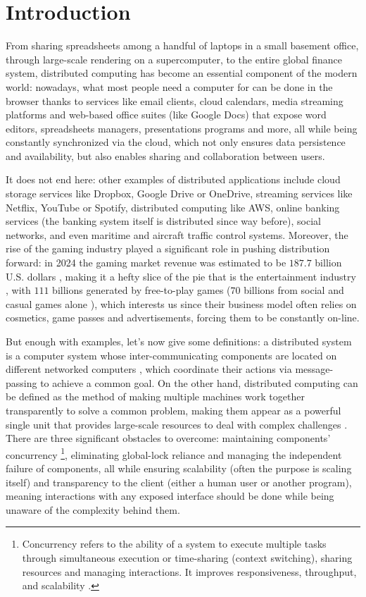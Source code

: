 \section{Introduction}

From sharing spreadsheets {among} a handful of laptops in a small basement office, through large-scale rendering on a supercomputer, to the entire global finance system, distributed computing has become an essential component of the modern world: nowadays, what most people need a computer for can be done in the browser thanks to services like email clients, cloud calendars, media streaming platforms and web-based office suites (like Google Docs) that expose word editors, spreadsheets managers, presentations programs and more, all while being constantly synchronized {via} the cloud, which not only ensures data persistence and availability, but also enables sharing and collaboration between users. 

It does not end here: other examples of distributed applications include cloud storage services like Dropbox, Google Drive or OneDrive, streaming services like Netflix, YouTube or Spotify, {distributed computing like AWS}, online banking services (the banking system itself is distributed since way before), social networks, and even maritime and aircraft traffic control systems.
Moreover, the rise of the gaming industry played a significant role in pushing distribution forward: in 2024 the gaming market revenue was estimated to be $187.7$ billion U.S. dollars \cite{newzoo}, making it a hefty slice of the pie that is the entertainment industry \cite{pwc}, with $111$ billions generated by free-to-play games \cite{f2prevenue} ($70$ billions from social and casual games alone \cite{casualgames}), which interests us since their business model often relies on cosmetics, game passes and advertisements, forcing them to be constantly on-line. 

But enough with examples, let's now {give some definitions}: a distributed system is a computer system whose inter-communicating components are located on different networked computers \cite{tanenbaum2017distributed,Apt2009}, which coordinate their actions via message-passing to achieve a common goal. {On the other hand, distributed computing can be defined as the method of making multiple machines work together transparently to solve a common problem, making them appear as a powerful single unit that provides large-scale resources to deal with complex challenges \cite{aws_distr}.} There are three significant {obstacles} to overcome: maintaining components' concurrency \footnote{Concurrency refers to the ability of a system to execute multiple tasks through simultaneous execution or time-sharing (context switching), sharing resources and managing interactions. It improves responsiveness, throughput, and scalability \cite{OSconcepts, computerOrganization, george_coulouris_distributed_2012, parallelComputing, parallelDistributedHandbook}.}, eliminating global-lock reliance and managing the independent failure of components, all while ensuring scalability (often the purpose is scaling itself) and transparency to the {client (either a human user or another program)}, meaning interactions with any exposed interface should be done while being unaware of the complexity behind them.

